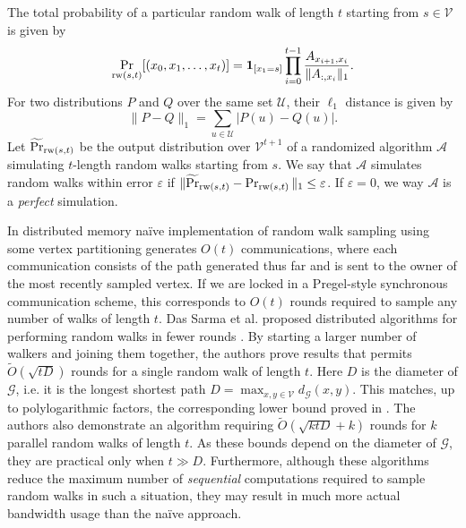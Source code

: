 \documentclass{report}
\begin{document}
The total probability of a particular random walk of length $t$ starting from $s \in \mathcal{V}$ is given by 
%
\begin{equation} \label{eq:walk:prob}
\Pr_{\textnormal{rw}(s,t)} [(x_0, x_1, \dots, x_t)] = \mathbf{1}_{[x_1 = s]} \prod\limits_{i = 0}^{t-1} \frac{A_{x_{i+1}, x_i}}{\|A_{:,x_i}\|_1}.
\end{equation}
%
For two distributions $P$ and $Q$ over the same set $\mathcal{U}$, their $\ell_1$ distance is given by
%
\begin{equation} \label{eq:distribution:distance}
\|P - Q\|_1 = \sum_{u \in \mathcal{U}} | P(u) - Q(u)|.
\end{equation}
%
Let $\widetilde{\Pr}_{\textnormal{rw}(s,t)}$  be the output distribution over $\mathcal{V}^{t+1}$ of a randomized algorithm $\mathcal{A}$ simulating $t$-length random walks starting from $s$.
We say that $\mathcal{A}$  simulates random walks within error $\varepsilon$ if $\|\widetilde{\Pr}_{\textnormal{rw}(s,t)} - \Pr_{\textnormal{rw}(s,t)}\|_1 \leq \varepsilon$.
If $\varepsilon = 0$, we way $\mathcal{A}$ is a \emph{perfect} simulation.

In distributed memory na\"ive implementation of random walk sampling using some vertex partitioning generates $O(t)$ communications, where each communication consists of the path generated thus far and is sent to the owner of the most recently sampled vertex. 
If we are locked in a Pregel-style synchronous communication scheme, this corresponds to $O(t)$ rounds required to sample any number of walks of length $t$. 
Das Sarma et al. proposed distributed algorithms for performing random walks in fewer rounds \cite{das2013distributed}.
By starting a larger number of walkers and joining them together, the authors prove results that permits $\widetilde{O}(\sqrt{tD})$ rounds for a single random walk of length $t$.
Here $D$ is the diameter of $\mathcal{G}$, i.e. it is the longest shortest path $D = \max_{x, y \in \mathcal{V}} d_{\mathcal{G}}(x,y)$.
This matches, up to polylogarithmic factors, the corresponding lower bound proved in \cite{nanongkai2011tight}.
The authors also demonstrate an algorithm requiring $\widetilde{O}(\sqrt{ktD} + k)$ rounds for $k$ parallel random walks of length $t$.
As these bounds depend on the diameter of $\mathcal{G}$, they are practical only when $t \gg D$. 
Furthermore, although these algorithms reduce the maximum number of \emph{sequential} computations required to sample random walks in such a situation, they may result in much more actual bandwidth usage than the na\"ive approach. 
\end{document}
